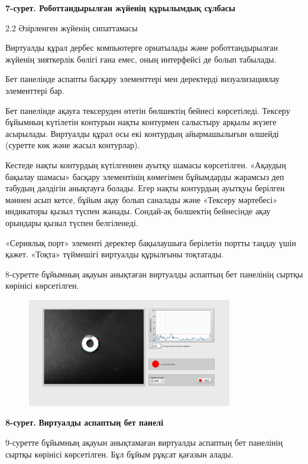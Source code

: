 {\bfseries 7-сурет. Роботтандырылған жүйенің құрылымдық сұлбасы}

2.2 Әзірленген жүйенің сипаттамасы

Виртуалды құрал дербес компьютерге орнатылады және роботтандырылған
жүйенің зияткерлік бөлігі ғана емес, оның интерфейсі де болып табылады.

Бет панелінде аспапты басқару элементтері мен деректерді визуализациялау
элементтері бар.

Бет панелінде ақауға тексеруден өтетін бөлшектің бейнесі көрсетіледі.
Тексеру бұйымның күтілетін контурын нақты контурмен салыстыру арқылы
жүзеге асырылады. Виртуалды құрал осы екі контурдың айырмашылығын
өлшейді (суретте көк және жасыл контурлар).

Кестеде нақты контурдың күтілгеннен ауытқу шамасы көрсетілген. «Ақаудың
бақылау шамасы» басқару элементінің көмегімен бұйымдарды жарамсыз деп
табудың дәлдігін анықтауға болады. Егер нақты контурдың ауытқуы берілген
мәннен асып кетсе, бұйым ақау болып саналады және «Тексеру мәртебесі»
индикаторы қызыл түспен жанады. Сондай-ақ бөлшектің бейнесінде ақау
орындары қызыл түспен белгіленеді.

«Сериялық порт» элементі деректер бақылаушыға берілетін портты таңдау
үшін қажет. «Тоқта» түймешігі виртуалды құрылғыны тоқтатады.

8-суретте бұйымның ақауын анықтаған виртуалды аспаптың бет панелінің
сыртқы көрінісі көрсетілген.


\begin{figure}[H]
	\centering
	\includegraphics[width=0.8\textwidth]{media/ict2/image176}
	\caption*{}
\end{figure}


{\bfseries 8-сурет.} {\bfseries Виртуалды аспаптың бет панелі}

9-суретте бұйымның ақауын анықтамаған виртуалды аспаптың бет панелінің
сыртқы көрінісі көрсетілген. Бұл бұйым рұқсат қағазын алады.


